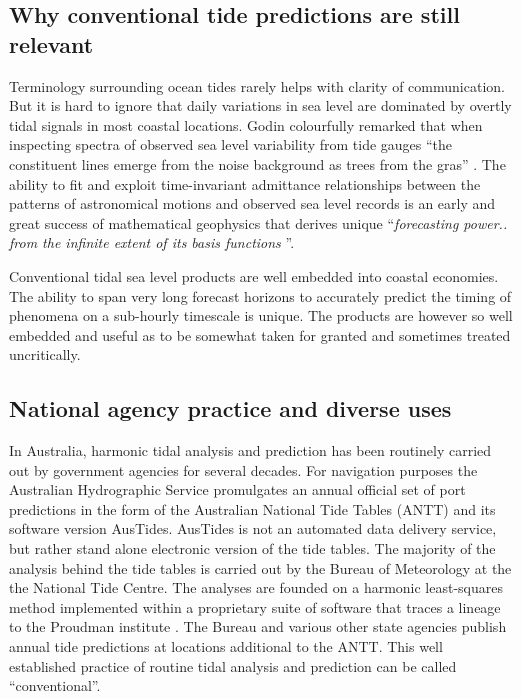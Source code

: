 \subsection{Why conventional tide predictions are still relevant}

Terminology surrounding ocean tides rarely helps with clarity of communication.  But it is hard to ignore that daily variations in sea level are dominated by overtly tidal signals in most coastal locations.  Godin colourfully remarked that when inspecting spectra of observed sea level variability from tide gauges ``the constituent lines emerge from the noise background as trees from the gras'' \cite{godin:1972}.
The ability to fit and exploit time-invariant admittance relationships between the patterns of astronomical motions and observed sea level records is an early and great success of mathematical geophysics \cite{Cartwright:2000tt} that derives unique ``\textit{forecasting power.. from the infinite extent of its basis functions} ''\citep{Flinchem:2000kp}.

Conventional tidal sea level products are well embedded into coastal economies.   The ability to span very long forecast horizons to accurately predict the timing of phenomena on a sub-hourly timescale is unique. 
The products are however so well embedded and useful as to be somewhat taken for granted and sometimes treated uncritically. 


\subsection{National agency practice and diverse uses}

In Australia, harmonic tidal analysis and prediction has been routinely carried out by government agencies for several decades.  For navigation purposes the Australian Hydrographic Service promulgates an annual official set of port predictions in the form of the Australian National Tide Tables (ANTT) and its software version AusTides.   AusTides is not an automated data delivery service, but rather stand alone electronic version of the tide tables.  
The majority of the analysis behind the tide tables is carried out by the Bureau of Meteorology at the the National Tide Centre.  
The analyses are founded on a harmonic least-squares method implemented within a proprietary suite of software that traces a lineage to the Proudman institute \citep{MHL2156}.    
The Bureau and various other state agencies publish annual tide predictions at locations additional to the ANTT. 
This well established practice of routine tidal analysis and prediction can be called ``conventional''.


